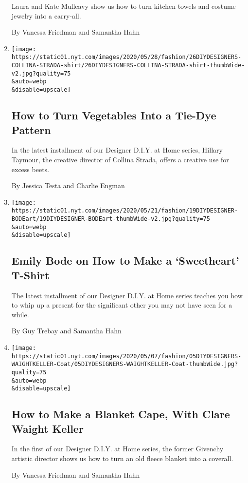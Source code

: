 \begin{enumerate}
  Laura and Kate Mulleavy show us how to turn kitchen towels and costume
  jewelry into a carry-all.

  By Vanessa Friedman and Samantha Hahn
\item
  \href{/2020/05/27/style/tie-dye-plaid-with-collina-strada.html}{}

  \texttt{[image: https://static01.nyt.com/images/2020/05/28/fashion/26DIYDESIGNERS-COLLINA-STRADA-shirt/26DIYDESIGNERS-COLLINA-STRADA-shirt-thumbWide-v2.jpg?quality=75\\\&auto=webp\\\&disable=upscale]}

  \hypertarget{how-to-turn-vegetables-into-a-tie-dye-pattern}{%
  \subsection{How to Turn Vegetables Into a Tie-Dye
  Pattern}\label{how-to-turn-vegetables-into-a-tie-dye-pattern}}

  In the latest installment of our Designer D.I.Y. at Home series,
  Hillary Taymour, the creative director of Collina Strada, offers a
  creative use for excess beets.

  By Jessica Testa and Charlie Engman
\item
  \href{/2020/05/19/style/emily-bode-sweetheart-t-shirt.html}{}

  \texttt{[image: https://static01.nyt.com/images/2020/05/21/fashion/19DIYDESIGNER-BODEart/19DIYDESIGNER-BODEart-thumbWide-v2.jpg?quality=75\\\&auto=webp\\\&disable=upscale]}

  \hypertarget{emily-bode-on-how-to-make-a-sweetheart-t-shirt}{%
  \subsection{Emily Bode on How to Make a `Sweetheart'
  T-Shirt}\label{emily-bode-on-how-to-make-a-sweetheart-t-shirt}}

  The latest installment of our Designer D.I.Y. at Home series teaches
  you how to whip up a present for the significant other you may not
  have seen for a while.

  By Guy Trebay and Samantha Hahn
\item
  \href{/2020/05/05/style/how-to-make-a-blanket-cape-with-clare-waight-keller.html}{}

  \texttt{[image: https://static01.nyt.com/images/2020/05/07/fashion/05DIYDESIGNERS-WAIGHTKELLER-Coat/05DIYDESIGNERS-WAIGHTKELLER-Coat-thumbWide.jpg?quality=75\\\&auto=webp\\\&disable=upscale]}

  \hypertarget{how-to-make-a-blanket-cape-with-clare-waight-keller}{%
  \subsection{How to Make a Blanket Cape, With Clare Waight
  Keller}\label{how-to-make-a-blanket-cape-with-clare-waight-keller}}

  In the first of our Designer D.I.Y. at Home series, the former
  Givenchy artistic director shows us how to turn an old fleece blanket
  into a coverall.

  By Vanessa Friedman and Samantha Hahn
\end{enumerate}

